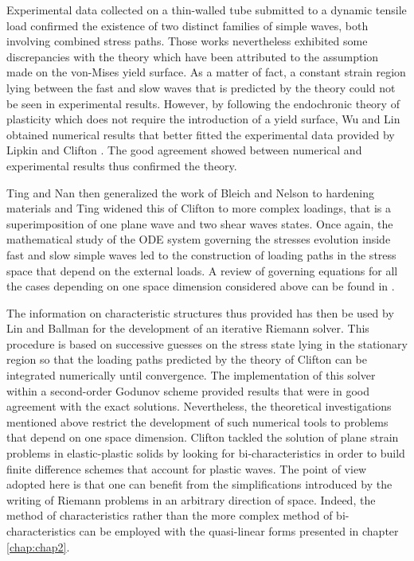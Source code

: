 Experimental data collected on a thin-walled tube submitted to a dynamic tensile load \cite{Clifton_exp,Clifton_exp2} confirmed the existence of two distinct families of  simple waves, both involving combined stress paths.
Those works nevertheless exhibited some discrepancies with the theory which have been attributed to the assumption made on the von-Mises yield surface.
As a matter of fact, a constant strain region lying between the fast and slow waves that is predicted by the theory \cite{Clifton} could not be seen in experimental results.
However, by following the endochronic theory of plasticity \cite{Valanis} which does not require the introduction of a yield surface, Wu and Lin \cite{Wu_experimental} obtained numerical results that better fitted the experimental data provided by Lipkin and Clifton \cite{Clifton_exp2}.
The good agreement showed between numerical and experimental results \cite{Wu_experimental} thus confirmed the theory.

Ting and Nan \cite{Ting68} then generalized the work of Bleich and Nelson to hardening materials and Ting \cite{Ting69} widened this of Clifton to more complex loadings, that is a superimposition of one plane wave and two shear waves states.
Once again, the mathematical study of the ODE system governing the stresses evolution inside fast and slow simple waves led to the construction of loading paths in the stress space that depend on the external loads. A review of governing equations for all the cases depending on one space dimension considered above can be found in \cite{Nowacki}.

The information on characteristic structures thus provided has then be used by Lin and Ballman \cite{Lin_et_Ballman} for the development of an iterative Riemann solver.
This procedure is based on successive guesses on the stress state lying in the stationary region so that the loading paths predicted by the theory of Clifton \cite{Clifton} can be integrated numerically until convergence.
The implementation of this solver within a second-order Godunov scheme provided results that were in good agreement with the exact solutions.
Nevertheless, the theoretical investigations mentioned above restrict the development of such numerical tools to problems that depend on one space dimension.
Clifton tackled the solution of plane strain problems in elastic-plastic solids by looking for bi-characteristics \cite{Clifton_thesis} in order to build finite difference schemes that account for plastic waves.
The point of view adopted here is that one can benefit from the simplifications introduced by the writing of Riemann problems in an arbitrary direction of space.
Indeed, the method of characteristics rather than the more complex method of bi-characteristics can be employed with the quasi-linear forms presented in chapter \ref{chap:chap2}.

